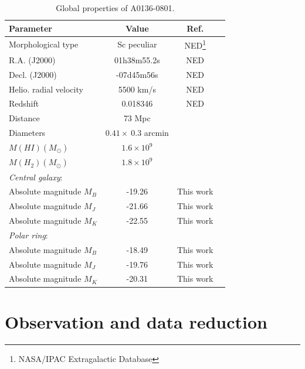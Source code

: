 \documentclass[useAMS,usenatbib]{mn2e}
\begin{document}
\begin{table}
\begin{minipage}[t]{\columnwidth}
\caption{Global properties of A0136-0801.}
\label{global}
 \centering
\renewcommand{\footnoterule}{}
\begin{tabular}{lccc}
\hline\hline
Parameter&Value&Ref.\\
\hline
Morphological type&Sc peculiar&NED\footnote{NASA/IPAC Extragalactic Database}\\
R.A. (J2000)           &01h38m55.2s &NED \\
Decl. (J2000)           &-07d45m56s&NED \\
Helio. radial velocity &5500 km/s&NED\\
Redshift         &0.018346 &NED\\
Distance      &73 Mpc     & \\
Diameters&$0.41 \times\ 0.3$ arcmin& \citet{Iod02b}\\
$M(HI)(M_{\odot})$  & $1.6 \times 10^{9}$& \citet{Ric94}\\
$M(H_{2})(M_{\odot})$  & $1.8 \times 10^{9}$& \citet{Gal97}\\
{\it Central galaxy}:&&\\
Absolute magnitude $M_{B}$& -19.26&This work\\
Absolute magnitude $M_{J}$& -21.66&This work\\
Absolute magnitude $M_{K}$& -22.55&This work\\
{\it Polar ring}:&&\\
Absolute magnitude $M_{B}$& -18.49&This work\\
Absolute magnitude $M_{J}$& -19.76&This work\\
Absolute magnitude $M_{K}$& -20.31&This work\\
\hline
\end{tabular}
\end{minipage}
\end{table}



\section{Observation and data reduction} \label{data}
\end{document}
